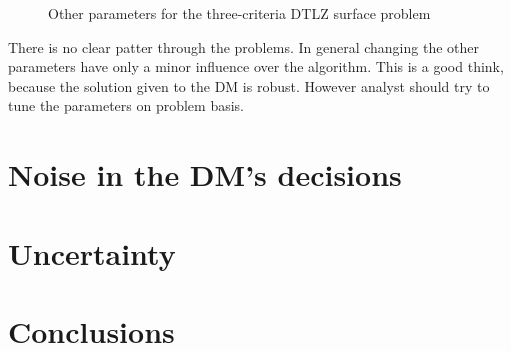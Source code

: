 \begin{figure}
{  }
  \caption{Other parameters for the three-criteria DTLZ surface problem}
  \label{params2}
\end{figure}

There is no clear patter through the problems. In general changing the other
parameters have only a minor influence over the algorithm. This is a good
think, because the solution given to the DM is robust. However analyst should
try to tune the parameters on problem basis. 


\clearpage{}
\section{Noise in the DM's decisions}

\section{Uncertainty}

\section{Conclusions}

